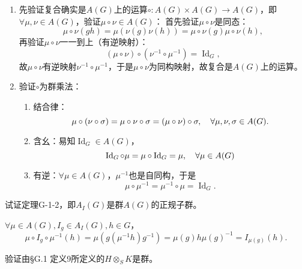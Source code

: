 \begin{xiti}
    \begin{zm}
    	\begin{enumerate}
    		\item 先验证复合确实是$A(G) $上的运算$\circ\colon A(G)\times A(G) \rightarrow A(G) $，即$\forall \mu,\nu \in A(G) $，验证$\mu \circ \nu \in A(G) $：
    		首先验证$\mu\circ \nu $是同态：\[ \mu\circ \nu (gh)=\mu\left( \nu(g) \nu(h) \right) =\mu\circ \nu (g) \mu\circ \nu(h), \]
    		再验证$\mu\circ \nu $一一到上（有逆映射）：\[ \left(\mu\circ \nu\right) \circ \left(\nu^{-1} \circ \mu^{-1}\right) = \operatorname{Id}_G, \]
    		故$\mu\circ\nu $有逆映射$\nu^{-1} \circ \mu^{-1} $，于是$\mu\circ\nu$为同构映射，故复合是$A(G)$上的运算。
    		\item 验证$\circ$为群乘法：
    		\begin{enumerate}
    			\item 结合律：\[ \mu \circ \left( \nu \circ \sigma \right) =\mu \circ \nu \circ \sigma = \left( \mu \circ \nu \right) \circ \sigma\qc \forall \mu,\nu,\sigma \in A(G). \]
    			\item 含幺：易知$\operatorname{Id}_G \in A(G) $，\[ \operatorname{Id}_G \circ \mu = \mu \circ \operatorname{Id}_{G} = \mu\qc \forall \mu \in A(G) \]
    			\item 有逆：$\forall \mu \in A(G) $，$\mu^{-1}$也是自同构，于是\[ \mu \circ \mu^{-1} = \mu^{-1} \circ \mu = \operatorname{Id}_G. \]
    		\end{enumerate}
    	\end{enumerate}
    \end{zm}

    \item 试证定理G-1-2，即$A_I(G)$是群$A(G)$的正规子群。
    
    \begin{zm}
    	$\forall \mu \in A(G),I_g\in A_I(G),h\in G $，\[ \mu\circ I_g \circ \mu^{-1} (h) =\mu \left( g (\mu^{-1} h) g^{-1} \right) = \mu(g) h \mu(g)^{-1} = I_{\mu(g)}(h) . \]
    \end{zm}
    
    \item 验证由\S G.1 定义9所定义的$H \otimes_S K $是群。
    

\end{xiti}
